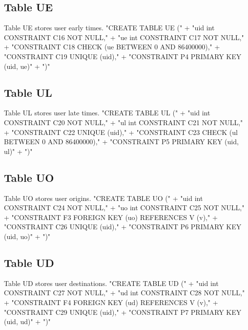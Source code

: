 \subsection{Table UE}
Table UE stores user early times.
\nwenddocs{}\endmoddef{}
"CREATE TABLE UE ("
  + "uid int  CONSTRAINT C16 NOT NULL,"
  + "ue  int  CONSTRAINT C17 NOT NULL,"
  + "CONSTRAINT C18 CHECK (ue BETWEEN 0 AND 86400000),"
  + "CONSTRAINT C19 UNIQUE (uid),"
  + "CONSTRAINT P4 PRIMARY KEY (uid, ue)"
  + ")"
\nwendcode{}\nwdocspar

\subsection{Table UL}
Table UL stores user late times.
\nwenddocs{}\endmoddef{}
"CREATE TABLE UL ("
  + "uid int  CONSTRAINT C20 NOT NULL,"
  + "ul  int  CONSTRAINT C21 NOT NULL,"
  + "CONSTRAINT C22 UNIQUE (uid),"
  + "CONSTRAINT C23 CHECK (ul BETWEEN 0 AND 86400000),"
  + "CONSTRAINT P5 PRIMARY KEY (uid, ul)"
  + ")"
\nwendcode{}\nwdocspar

\subsection{Table UO}
Table UO stores user origins.
\nwenddocs{}\endmoddef{}
"CREATE TABLE UO ("
  + "uid int  CONSTRAINT C24 NOT NULL,"
  + "uo  int  CONSTRAINT C25 NOT NULL,"
  + "CONSTRAINT F3 FOREIGN KEY (uo) REFERENCES V (v),"
  + "CONSTRAINT C26 UNIQUE (uid),"
  + "CONSTRAINT P6 PRIMARY KEY (uid, uo)"
  + ")"
\nwendcode{}\nwdocspar

\subsection{Table UD}
Table UD stores user destinations.
\nwenddocs{}\endmoddef{}
"CREATE TABLE UD ("
  + "uid int  CONSTRAINT C27 NOT NULL,"
  + "ud  int  CONSTRAINT C28 NOT NULL,"
  + "CONSTRAINT F4 FOREIGN KEY (ud) REFERENCES V (v),"
  + "CONSTRAINT C29 UNIQUE (uid),"
  + "CONSTRAINT P7 PRIMARY KEY (uid, ud)"
  + ")"
\nwendcode{}\nwdocspar

